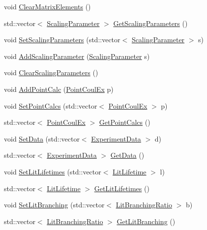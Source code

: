 \begin{DoxyCompactItemize}
\item 
void \hyperlink{classCoulExFitter_a3e300781a246a5f162a8c12b1d1d5461}{Clear\-Matrix\-Elements} ()
\item 
std\-::vector$<$ \hyperlink{classScalingParameter}{Scaling\-Parameter} $>$ \hyperlink{classCoulExFitter_a1eeaeb97c9f1133f1d8140bee0deddad}{Get\-Scaling\-Parameters} ()
\item 
void \hyperlink{classCoulExFitter_a900b2c3070ea11e65c6ce6753d50f644}{Set\-Scaling\-Parameters} (std\-::vector$<$ \hyperlink{classScalingParameter}{Scaling\-Parameter} $>$ s)
\item 
void \hyperlink{classCoulExFitter_ab0bb6b9cb3f63281e4e310a359293e24}{Add\-Scaling\-Parameter} (\hyperlink{classScalingParameter}{Scaling\-Parameter} s)
\item 
void \hyperlink{classCoulExFitter_a379e336a5bf3534a68a2b30aae1b03d6}{Clear\-Scaling\-Parameters} ()
\item 
void \hyperlink{classCoulExFitter_aa61a8d54329e77a5a8ffc7d760a7acad}{Add\-Point\-Calc} (\hyperlink{classPointCoulEx}{Point\-Coul\-Ex} p)
\item 
void \hyperlink{classCoulExFitter_ad3dadcfe5be98bd37a9a0e10ba8866ef}{Set\-Point\-Calcs} (std\-::vector$<$ \hyperlink{classPointCoulEx}{Point\-Coul\-Ex} $>$ p)
\item 
std\-::vector$<$ \hyperlink{classPointCoulEx}{Point\-Coul\-Ex} $>$ \hyperlink{classCoulExFitter_af845588f78e360df8f1054b2b06b1320}{Get\-Point\-Calcs} ()
\item 
void \hyperlink{classCoulExFitter_a44ec14a6b681ac7feccdf2dc119a5450}{Set\-Data} (std\-::vector$<$ \hyperlink{classExperimentData}{Experiment\-Data} $>$ d)
\item 
std\-::vector$<$ \hyperlink{classExperimentData}{Experiment\-Data} $>$ \hyperlink{classCoulExFitter_a8bbef087dbeab8832c0cfb52b6b7f8de}{Get\-Data} ()
\item 
void \hyperlink{classCoulExFitter_a4404962fd56e3d1543061b5d141d655f}{Set\-Lit\-Lifetimes} (std\-::vector$<$ \hyperlink{classLitLifetime}{Lit\-Lifetime} $>$ l)
\item 
std\-::vector$<$ \hyperlink{classLitLifetime}{Lit\-Lifetime} $>$ \hyperlink{classCoulExFitter_a16cb5175295b5f14547db8dd63f95541}{Get\-Lit\-Lifetimes} ()
\item 
void \hyperlink{classCoulExFitter_a349703eec8df817afb031d536622af69}{Set\-Lit\-Branching} (std\-::vector$<$ \hyperlink{classLitBranchingRatio}{Lit\-Branching\-Ratio} $>$ b)
\item 
std\-::vector$<$ \hyperlink{classLitBranchingRatio}{Lit\-Branching\-Ratio} $>$ \hyperlink{classCoulExFitter_a74d75b806bee4687703d1611c7710ad8}{Get\-Lit\-Branching} ()

\end{DoxyCompactItemize}
